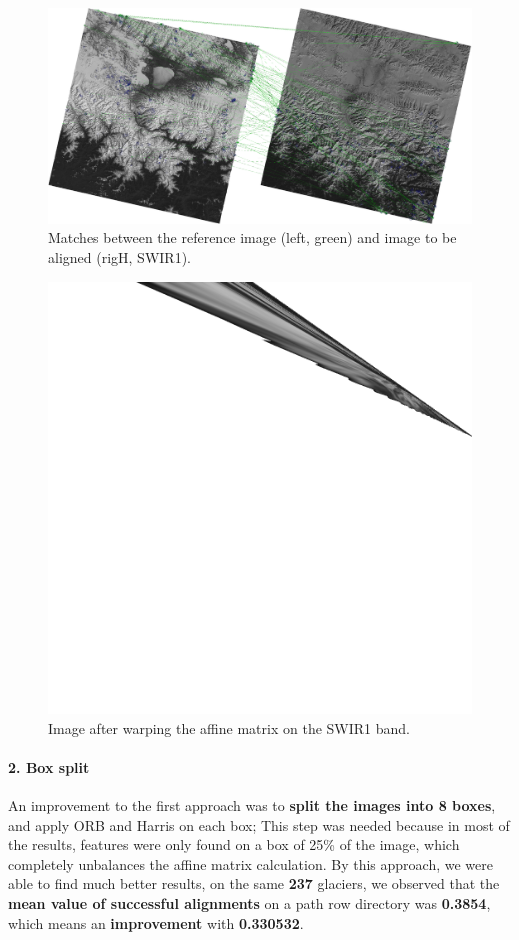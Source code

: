 \documentclass[12pt, a4paper]{report}
\begin{document}
	\begin{figure}[H]
		\centering
		\includegraphics[scale=0.25]{bad_matches_1.png}
		\caption{Matches between the reference image (left, green) and image to be aligned (rigH, SWIR1).}
		\label{fig:bad_matches_1}
	\end{figure}
	
	\begin{figure}[H]
		\centering
		\includegraphics[scale=0.1]{bad_result_1.png}
		\caption{Image after warping the affine matrix on the SWIR1 band.}
		\label{fig:bad_reference_1}
	\end{figure}
	
	\paragraph{2. Box split} An improvement to the first approach was to \textbf{split the images into 8 boxes}, and apply ORB and Harris on each box; This step was needed because in most of the results, features were only found on a box of 25\% of the image, which completely unbalances the affine matrix calculation. By this approach, we were able to find much better results, on the same \textbf{237} glaciers, we observed that the \textbf{mean value of successful alignments} on a path row directory was \textbf{0.3854}, which means an \textbf{improvement} with \textbf{0.330532}.
	
\end{document}
